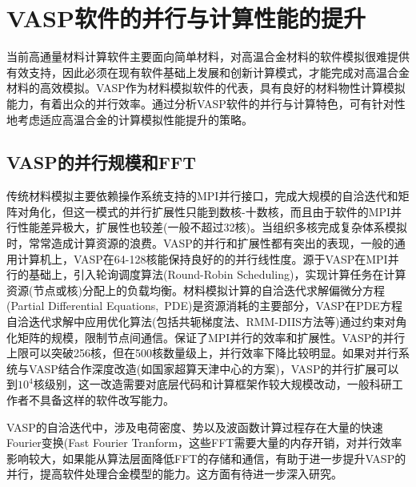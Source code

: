 \section{\rm{VASP}软件的并行与计算性能的提升}
当前高通量材料计算软件主要面向简单材料，对高温合金材料的软件模拟很难提供有效支持，因此必须在现有软件基础上发展和创新计算模式，才能完成对高温合金材料的高效模拟。\textrm{VASP}作为材料模拟软件的代表，具有良好的材料物性计算模拟能力，有着出众的并行效率。通过分析\textrm{VASP}软件的并行与计算特色，可有针对性地考虑适应高温合金的计算模拟性能提升的策略。

\subsection{\rm{VASP}的并行规模和\rm{FFT}}
传统材料模拟主要依赖操作系统支持的\textrm{MPI}并行接口，完成大规模的自洽迭代和矩阵对角化，但这一模式的并行扩展性只能到数核-十数核，而且由于软件的\textrm{MPI}并行性能差异极大，扩展性也较差(一般不超过32核)。当组织多核完成复杂体系模拟时，常常造成计算资源的浪费。\textrm{VASP}的并行和扩展性都有突出的表现，一般的通用计算机上，\textrm{VASP}在64-128核能保持良好的的并行线性度。源于\textrm{VASP}在\textrm{MPI}并行的基础上，引入轮询调度算法\textrm{(Round-Robin Scheduling)}，实现计算任务在计算资源(节点或核)分配上的负载均衡。材料模拟计算的自洽迭代求解偏微分方程\textrm{(Partial Differential Equations,~PDE)}是资源消耗的主要部分，\textrm{VASP}在\textrm{PDE}方程自洽迭代求解中应用优化算法(包括共轭梯度法、\textrm{RMM-DIIS}方法等)通过约束对角化矩阵的规模，限制节点间通信。保证了\textrm{MPI}并行的效率和扩展性。\textrm{VASP}的并行上限可以突破256核，但在500核数量级上，并行效率下降比较明显。如果对并行系统与\textrm{VASP}结合作深度改造(如国家超算天津中心的方案)，\textrm{VASP}的并行扩展可以到$10^4$核级别，这一改造需要对底层代码和计算框架作较大规模改动，一般科研工作者不具备这样的软件改写能力。

\textrm{VASP}的自洽迭代中，涉及电荷密度、势以及波函数计算过程存在大量的快速\textrm{Fourier}变换(\textrm{Fast Fourier Tranform}，这些\textrm{FFT}需要大量的内存开销，对并行效率影响较大，如果能从算法层面降低\textrm{FFT}的存储和通信，有助于进一步提升\textrm{VASP}的并行，提高软件处理合金模型的能力。这方面有待进一步深入研究。

